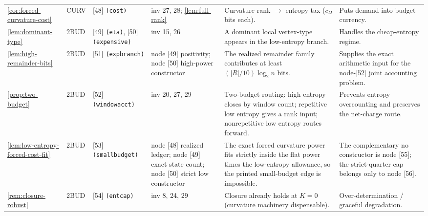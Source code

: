 \documentclass[11pt]{article}
\begin{document}
{\begin{longtable}{L{0.10\textwidth} C{0.045\textwidth} L{0.13\textwidth} L{0.135\textwidth} L{0.28\textwidth} L{0.20\textwidth}}
\cref{cor:forced-curvature-cost} & CURV & [48] \texttt{(cost)} & inv 27, 28; \cref{lem:full-rank} & Curvature rank $\to$ entropy tax ($c_\Omega$ bits each). & Puts demand into budget currency. \\
\cref{lem:dominant-type} & 2BUD & [49] \texttt{(eta)}, [50] \texttt{(expensive)} & inv 15, 26 & A dominant local vertex-type appears in the low-entropy branch. & Handles the cheap-entropy regime. \\
\cref{lem:high-remainder-bits} & 2BUD & [51] \texttt{(expbranch)} & node [49] positivity; node [50] high-power constructor & The realized remainder family contributes at least $(|R|/10)\log_2n$ bits. & Supplies the exact arithmetic input for the node-[52] joint accounting problem. \\
\cref{prop:two-budget} & 2BUD & [52] \texttt{(windowacct)} & inv 20, 27, 29 & Two-budget routing: high entropy closes by window count; repetitive low entropy gives a rank input; nonrepetitive low entropy routes forward. & Prevents entropy overcounting and preserves the net-charge route. \\
\cref{lem:low-entropy-forced-cost-fit} & 2BUD & [53] \texttt{(smallbudget)} & node [48] realized ledger; node [49] exact state count; node [50] strict low constructor & The exact forced curvature power fits strictly inside the flat power times the low-entropy allowance, so the printed small-budget edge is impossible. & The complementary no constructor is node [55]; the strict-quarter cap belongs only to node [56]. \\
\cref{rem:closure-robust} & 2BUD & [54] \texttt{(entcap)} & inv 8, 24, 29 & Closure already holds at $K=0$ (curvature machinery dispensable). & Over-determination / graceful degradation. \\
\bottomrule
\end{longtable}
}
\end{document}
